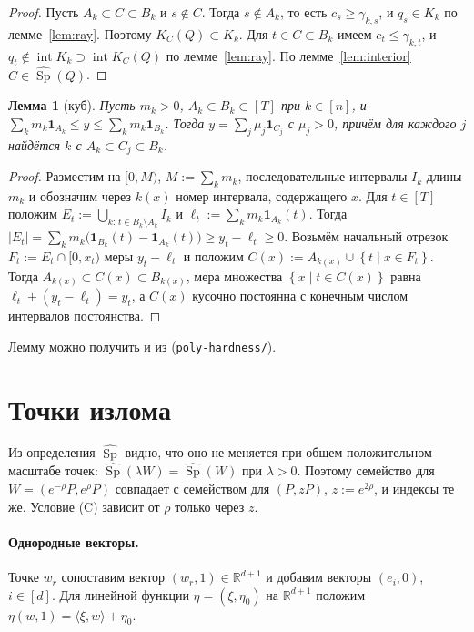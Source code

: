 \documentclass[a4paper,11pt]{article}
\newcommand{\lean}[1]{\mbox{\path{#1}}} %
\theoremstyle{plain}
\newtheorem{lemma}[theorem]{Лемма}
\theoremstyle{definition}
\theoremstyle{remark}
\newcommand{\R}{\mathbb{R}}
\newcommand{\abs}[1]{\left\lvert #1 \right\rvert}
\newcommand{\set}[1]{\left\{ #1 \right\}}
\newcommand{\ip}[2]{\langle #1, #2\rangle} %
\DeclareMathOperator{\Sp}{Sp}
\DeclareMathOperator{\interior}{int}
\begin{document}
\begin{proof}
    Пусть $A_k\subset C\subset B_k$ и $s\notin C$. Тогда $s\notin A_k$, то есть $c_s\ge\gamma_{k,s}$, и $q_s\in K_k$ по лемме~\ref{lem:ray}. Поэтому $K_C(Q)\subset K_k$. Для $t\in C\subset B_k$ имеем $c_t\le\gamma_{k,t}$, и $q_t\notin\interior K_k\supset\interior K_C(Q)$ по лемме~\ref{lem:ray}. По лемме~\ref{lem:interior} $C\in\widehat{\Sp}(Q)$.
\end{proof}

\begin{lemma}[куб]\label{lem:cube}
    Пусть $m_k>0$, $A_k\subset B_k\subset[T]$ при $k\in[n]$, и $\sum_km_k\mathbf 1_{A_k}\le y\le\sum_km_k\mathbf 1_{B_k}$. Тогда $y=\sum_j\mu_j\mathbf 1_{C_j}$ с $\mu_j>0$, причём для каждого $j$ найдётся $k$ с $A_k\subset C_j\subset B_k$.
\end{lemma}

\begin{proof}
    Разместим на $[0,M)$, $M:=\sum_km_k$, последовательные интервалы $I_k$ длины $m_k$ и обозначим через $k(x)$ номер интервала, содержащего $x$. Для $t\in[T]$ положим $E_t:=\bigcup_{k:\,t\in B_k\setminus A_k}I_k$ и $\ell_t:=\sum_km_k\mathbf 1_{A_k}(t)$. Тогда $\abs{E_t}=\sum_km_k\bigl(\mathbf 1_{B_k}(t)-\mathbf 1_{A_k}(t)\bigr)\ge y_t-\ell_t\ge0$. Возьмём начальный отрезок $F_t:=E_t\cap[0,x_t)$ меры $y_t-\ell_t$ и положим $C(x):=A_{k(x)}\cup\set{t\mid x\in F_t}$. Тогда $A_{k(x)}\subset C(x)\subset B_{k(x)}$, мера множества $\set{x\mid t\in C(x)}$ равна $\ell_t+(y_t-\ell_t)=y_t$, а $C(x)$ кусочно постоянна с конечным числом интервалов постоянства.
\end{proof}

Лемму можно получить и из \lean{PolyHardness.cube_mem_span} (\texttt{poly-hardness/}).

\section{Точки излома}

Из определения $\widehat{\Sp}$ видно, что оно не меняется при общем положительном масштабе точек: $\widehat{\Sp}(\lambda W)=\widehat{\Sp}(W)$ при $\lambda>0$. Поэтому семейство для $W=(e^{-\rho}P,e^{\rho}P)$ совпадает с семейством для $(P,zP)$, $z:=e^{2\rho}$, и индексы те же. Условие (C) зависит от $\rho$ только через $z$.

\paragraph{Однородные векторы.} Точке $w_r$ сопоставим вектор $(w_r,1)\in\R^{d+1}$ и добавим векторы $(e_i,0)$, $i\in[d]$. Для линейной функции $\eta=(\xi,\eta_0)$ на $\R^{d+1}$ положим $\eta(w,1)=\ip{\xi}{w}+\eta_0$.
\end{document}

